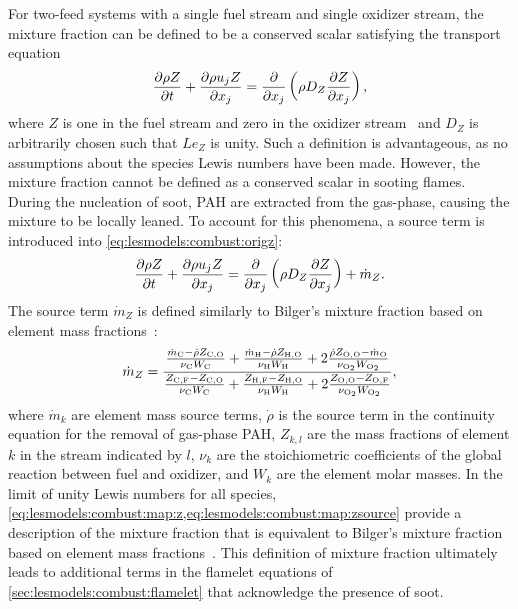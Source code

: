For two-feed systems with a single fuel stream and single oxidizer stream, the mixture fraction can be defined to be a conserved scalar satisfying the transport equation
\begin{equation}\label{eq:lesmodels:combust:origz}
\trder{Z} = \pder[]{x_j}\left( \rho D_Z \pder[Z]{x_j} \right),
\end{equation}
where $Z$ is one in the fuel stream and zero in the oxidizer stream~\cite{pitsch1998} and $D_Z$ is arbitrarily chosen such that $Le_Z$ is unity. Such a definition is advantageous, as no assumptions about the species Lewis numbers have been made. However, the mixture fraction cannot be defined as a conserved scalar in sooting flames. During the nucleation of soot, PAH are extracted from the gas-phase, causing the mixture to be locally leaned. To account for this phenomena, a source term is introduced into \cref{eq:lesmodels:combust:origz}:
\begin{equation}\label{eq:lesmodels:combust:map:z}
  \trder{Z} = \pder[]{x_j}\left( \rho D_Z \pder[Z]{x_j} \right) + \dot{m}_Z.
\end{equation}
The source term $\dot{m}_Z$ is defined similarly to Bilger's mixture fraction based on element mass fractions~\cite{bilger1989}:
\begin{equation}\label{eq:lesmodels:combust:map:zsource}
  \dot{m}_Z = \frac{\frac{\dot{m}_{\ce{C}} - \dot{\rho}Z_{\ce{C},\ce{O}}}{\nu_{\ce{C}}W_{\ce{C}}} + \frac{\dot{m}_{\ce{H}} - \dot{\rho}Z_{\ce{H},\ce{O}}}{\nu_{\ce{H}}W_{\ce{H}}} + 2\frac{\dot{\rho}Z_{\ce{O},\ce{O}} - \dot{m}_{\ce{O}}}{\nu_{\ce{O2}}W_{\ce{O2}}}}{\frac{Z_{\ce{C},\ce{F}} - Z_{\ce{C},\ce{O}}}{\nu_{\ce{C}}W_{\ce{C}}} + \frac{Z_{\ce{H},\ce{F}} - Z_{\ce{H},\ce{O}}}{\nu_{\ce{H}}W_{\ce{H}}} + 2\frac{Z_{\ce{O},\ce{O}} - Z_{\ce{O},\ce{F}}}{\nu_{\ce{O2}}W_{\ce{O2}}}},
\end{equation}
where $\dot{m}_k$ are element mass source terms, $\dot{\rho}$ is the source term in the continuity equation for the removal of gas-phase PAH, $Z_{k,l}$ are the mass fractions of element $k$ in the stream indicated by $l$, $\nu_k$ are the stoichiometric coefficients of the global reaction between fuel and oxidizer, and $W_{k}$ are the element molar masses. In the limit of unity Lewis numbers for all species, \cref{eq:lesmodels:combust:map:z,eq:lesmodels:combust:map:zsource} provide a description of the mixture fraction that is equivalent to Bilger's mixture fraction based on element mass fractions~\cite{bilger1989}. This definition of mixture fraction ultimately leads to additional terms in the flamelet equations of \cref{sec:lesmodels:combust:flamelet} that acknowledge the presence of soot.

